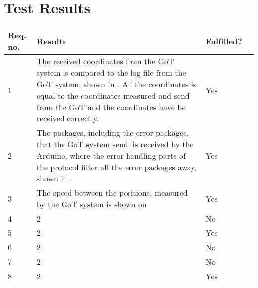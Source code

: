 \section{Test Results}\label{cha:TestProcedure}

\begin{table}[H] \centering
\begin{tabular}{|p{2cm}|p{9cm}|p{2cm}|p{3cm}|}
\hline%
\textbf{Req. no.}  &  \textbf{Results} &  \textbf{Fulfilled?}         \\
\hline%
           1    &   The received coordinates from the GoT system is compared to the log file from the GoT system, shown in \tableref{}. All the coordinates is equal to the coordinates measured and send from the GoT and the coordinates have be received correctly.    &   Yes               \\
\hline%
           2    &   The packages, including the error packages, that the GoT system send, is received by the Arduino, where the error handling parts of the protocol filter all the error packages away, shown in \tableref{}.   &  Yes                \\
\hline%
           3    &   The speed between the positions, measured by the GoT system is shown on \figref {}   &  Yes            \\
\hline%
           4    &   2   &   No                \\
\hline%
           5    &   2 &   Yes              \\
\hline%
           6    &   2  &    No                \\
\hline%
           7    &   2   &   No            \\ 
\hline%
           8    &   2  &    Yes              \\
\hline%
\end{tabular}
\label{tab:AcceptTestTestResults}
\end{table}

